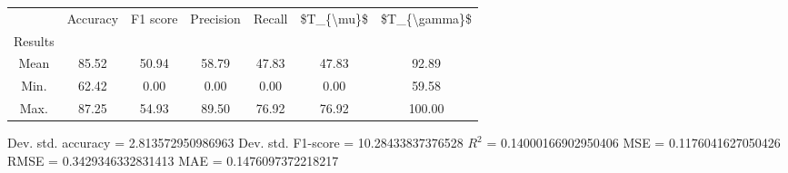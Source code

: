 \begin{tabular}{|c|c|c|c|c|c|c|}
\toprule
{} &  Accuracy &  F1 score &  Precision &  Recall &  \$T\_\{\textbackslash mu\}\$ &  \$T\_\{\textbackslash gamma\}\$ \\
Results &           &           &            &         &            &               \\
\hline
Mean    &     85.52 &     50.94 &      58.79 &   47.83 &      47.83 &         92.89 \\
Min.    &     62.42 &      0.00 &       0.00 &    0.00 &       0.00 &         59.58 \\
Max.    &     87.25 &     54.93 &      89.50 &   76.92 &      76.92 &        100.00 \\
\bottomrule
\end{tabular}

 Dev. std. accuracy = 2.813572950986963
 Dev. std. F1-score = 10.28433837376528
 $R^2$ = 0.14000166902950406
 MSE = 0.1176041627050426
 RMSE = 0.3429346332831413
 MAE = 0.1476097372218217